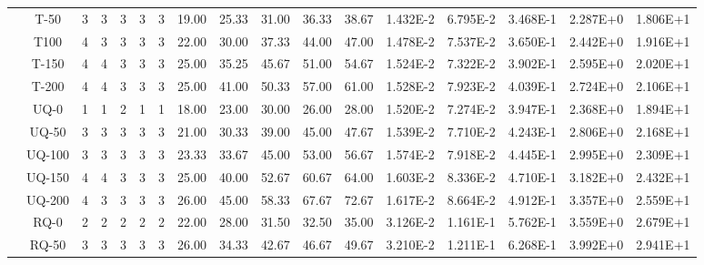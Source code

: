 \begin{table}[ht]
\begin{center}
{\begin{tabular}{cc|c|c|c|c|c|c|c|c|c|c|c|c|c|c|c|}
\multicolumn{1}{|c|}{}                      & \multicolumn{1}{|c|}{T-50} & 	3	&	3	&	3	&	3	&	3	&	19.00	&	25.33	&	31.00	&	36.33	&	38.67	&	1.432E-2	&	6.795E-2	&	3.468E-1	&	2.287E+0	&	1.806E+1	\\
\multicolumn{1}{|c|}{}                      & \multicolumn{1}{|c|}{T100} &	4	&	3	&	3	&	3	&	3	&	22.00	&	30.00	&	37.33	&	44.00	&	47.00	&	1.478E-2	&	7.537E-2	&	3.650E-1	&	2.442E+0	&	1.916E+1	\\
\multicolumn{1}{|c|}{}                      & \multicolumn{1}{|c|}{T-150} &	4	&	4	&	3	&	3	&	3	&	25.00	&	35.25	&	45.67	&	51.00	&	54.67	&	1.524E-2	&	7.322E-2	&	3.902E-1	&	2.595E+0	&	2.020E+1	\\
\multicolumn{1}{|c|}{}                      & \multicolumn{1}{|c|}{T-200} &	4	&	4	&	3	&	3	&	3	&	25.00	&	41.00	&	50.33	&	57.00	&	61.00	&	1.528E-2	&	7.923E-2	&	4.039E-1	&	2.724E+0	&	2.106E+1	\\
\cline{2-17}																														
\multicolumn{1}{|c|}{}                      & \multicolumn{1}{|c|}{UQ-0} &	1	&	1	&	2	&	1	&	1	&	18.00	&	23.00	&	30.00	&	26.00	&	28.00	&	1.520E-2	&	7.274E-2	&	3.947E-1	&	2.368E+0	&	1.894E+1	\\
\multicolumn{1}{|c|}{}                      & \multicolumn{1}{|c|}{UQ-50} &	3	&	3	&	3	&	3	&	3	&	21.00	&	30.33	&	39.00	&	45.00	&	47.67	&	1.539E-2	&	7.710E-2	&	4.243E-1	&	2.806E+0	&	2.168E+1	\\
\multicolumn{1}{|c|}{}                      & \multicolumn{1}{|c|}{UQ-100} &	3	&	3	&	3	&	3	&	3	&	23.33	&	33.67	&	45.00	&	53.00	&	56.67	&	1.574E-2	&	7.918E-2	&	4.445E-1	&	2.995E+0	&	2.309E+1	\\
\multicolumn{1}{|c|}{}                      & \multicolumn{1}{|c|}{UQ-150} &	4	&	4	&	3	&	3	&	3	&	25.00	&	40.00	&	52.67	&	60.67	&	64.00	&	1.603E-2	&	8.336E-2	&	4.710E-1	&	3.182E+0	&	2.432E+1	\\
\multicolumn{1}{|c|}{}                      & \multicolumn{1}{|c|}{UQ-200} &	4	&	3	&	3	&	3	&	3	&	26.00	&	45.00	&	58.33	&	67.67	&	72.67	&	1.617E-2	&	8.664E-2	&	4.912E-1	&	3.357E+0	&	2.559E+1	\\
\cline{2-17}																														
\multicolumn{1}{|c|}{}                      & \multicolumn{1}{|c|}{RQ-0} &	2	&	2	&	2	&	2	&	2	&	22.00	&	28.00	&	31.50	&	32.50	&	35.00	&	3.126E-2	&	1.161E-1	&	5.762E-1	&	3.559E+0	&	2.679E+1	\\
\multicolumn{1}{|c|}{}                      & \multicolumn{1}{|c|}{RQ-50} & 	3	&	3	&	3	&	3	&	3	&	26.00	&	34.33	&	42.67	&	46.67	&	49.67	&	3.210E-2	&	1.211E-1	&	6.268E-1	&	3.992E+0	&	2.941E+1	\\

\end{tabular}}
\end{center}
\end{table}

